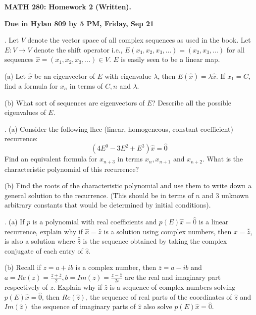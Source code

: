 \documentclass[12 pt]{article}
\begin{document}
\centerline{\bf MATH 280: Homework 2 (Written). }
\centerline{\bf Due in Hylan 809 by 5 PM, Friday, Sep 21}

\bigskip

. Let $V$ denote the vector space of all complex sequences as used in the book. Let $E: V \to V$ denote 
the shift operator i.e., $E(x_1,x_2, x_3, \dots) = (x_2, x_3, \dots)$ for all sequences $\hat{x} = (x_1,x_2,x_3,\dots) \in V$.
$E$ is easily seen to be a linear map.

\noindent
(a) Let $\hat{x}$ be an eigenvector of $E$ with eigenvalue $\lambda$, then $E(\hat{x}) = \lambda \hat{x}$. 
If $x_1=C$, find a formula for $x_n$ in terms of $C, n$ and $\lambda$.

\noindent
(b) What sort of sequences are eigenvectors of $E$? Describe all the possible eigenvalues of $E$.

\medskip

. 
(a) Consider the following lhcc (linear, homogeneous, constant coefficient) recurrence:
$$
(4E^0 - 3E^2 + E^3)\hat{x} = \hat{0}
$$
Find an equivalent formula for $x_{n+3}$ in terms $x_n, x_{n+1}$ and $x_{n+2}$. 
What is the characteristic polynomial of this recurrence?

\noindent
(b) Find the roots of the characteristic polynomial and use them to write down a general 
solution to the recurrence. (This should be in terms of $n$ and $3$ unknown arbitrary constants that would be determined by initial conditions).

\medskip

. (a) If $p$ is a polynomial with real coefficients and $p(E) \hat{x} = \hat{0}$ is a linear recurrence, explain why if $\hat{x} = \hat{z}$ 
is a solution using complex numbers, then $\hat{x} = \bar{\hat{z}}$, is also a solution where $\bar{\hat{z}}$ is the sequence obtained 
by taking the complex conjugate of each entry of $\hat{z}$. 

\medskip

\noindent
(b) Recall if $z=a+ib$ is a complex number, then $\bar{z}=a-ib$ and $a=Re(z) = \frac{z+\bar{z}}{2}, b=Im(z)=\frac{z-\bar{z}}{2i}$ are the real 
and imaginary part respectively of $z$. Explain why if $\hat{z}$ is a sequence of complex numbers solving $p(E) \hat{x}=\hat{0}$, 
then $Re(\hat{z})$, the sequence of real parts of the coordinates of $\hat{z}$ and $Im(\hat{z})$ the sequence of imaginary parts of 
$\hat{z}$ also solve $p(E)\hat{x}=\hat{0}$.

\medskip
\end{document}
